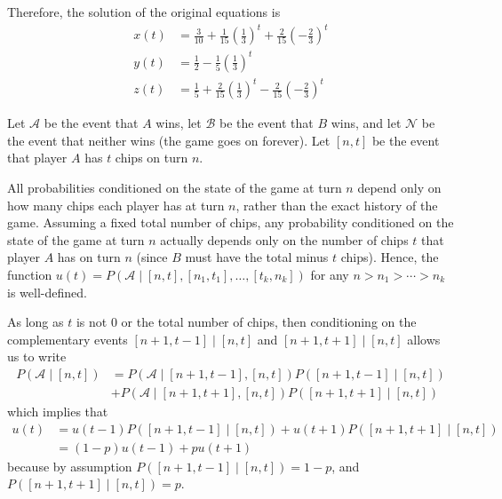 \documentclass[newpage]{homework}
\begin{document}
	
	Therefore, the solution of the original equations is
	\begin{equation*}
		\begin{aligned}
			x(t) &= \frac{3}{10} + \frac{1}{15}\left(\frac{1}{3}\right)^t + \frac{2}{15}\left(-\frac{2}{3}\right)^t\\
			y(t) &= \frac{1}{2} - \frac{1}{5}\left(\frac{1}{3}\right)^t \\
			z(t) &= \frac{1}{5} + \frac{2}{15}\left(\frac{1}{3}\right)^t - \frac{2}{15}\left(-\frac{2}{3}\right)^t
		\end{aligned}
	\end{equation*}

	\newcommand{\awin}{\mathcal{A}}
	\newcommand{\bwin}{\mathcal{B}}
	\newcommand{\nowin}{\mathcal{N}}
	\newcommand{\chips}[2]{[#1,#2]}
	\begin{alphaparts}
		\questionpart Let $\mathcal{A}$ be the event that $A$ wins, let $\mathcal{B}$ be the event that $B$ wins, and let $\mathcal{N}$ be the event that neither wins (the game goes on forever). Let $\chips{n}{t}$ be the event that player $A$ has $t$ chips on turn $n$.
		
		All probabilities conditioned on the state of the game at turn $n$ depend only on how many chips each player has at turn $n$, rather than the exact history of the game. Assuming a fixed total number of chips, any probability conditioned on the state of the game at turn $n$ actually depends only on the number of chips $t$ that player $A$ has on turn $n$ (since $B$ must have the total minus $t$ chips). Hence, the function $u(t) = P(\awin \mid \chips{n}{t}, \chips{n_1}{t_1}, \dots, \chips{t_k}{n_k})$ for any $n > n_1 > \cdots > n_k$ is well-defined.
		
		As long as $t$ is not 0 or the total number of chips, then conditioning on the complementary events $\chips{n+1}{t-1} \mid \chips{n}{t}$ and $\chips{n+1}{t+1} \mid \chips{n}{t}$ allows us to write
		\begin{equation*}
			\begin{aligned}
				P(\mathcal{A} \mid \chips{n}{t}) &= P(\mathcal{A} \mid \chips{n+1}{t-1}, \chips{n}{t})P(\chips{n+1}{t-1} \mid \chips{n}{t}) \\
				&+ P(\mathcal{A} \mid \chips{n+1}{t+1}, \chips{n}{t}) P(\chips{n+1}{t+1} \mid \chips{n}{t})
			\end{aligned}
		\end{equation*}
		which implies that
		\begin{equation*}
			\begin{aligned}
				u(t) &= u(t-1)P(\chips{n+1}{t-1} \mid \chips{n}{t}) + u(t+1)P(\chips{n+1}{t+1}\mid \chips{n}{t}) \\
				&= (1-p)u(t-1) + pu(t+1)
			\end{aligned}
		\end{equation*}
		because by assumption $P(\chips{n+1}{t-1}\mid\chips{n}{t}) = 1-p$, and $P(\chips{n+1}{t+1}\mid\chips{n}{t}) = p$.
		

\end{alphaparts}
\end{document}
